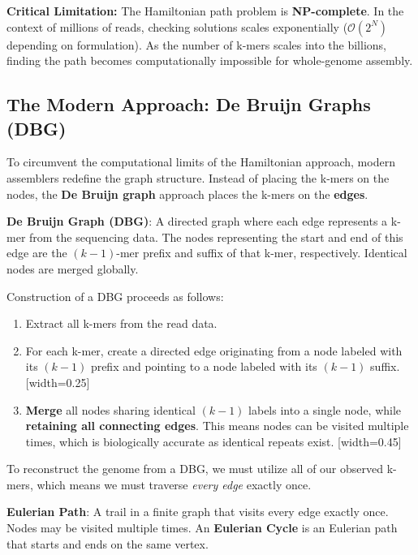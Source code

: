 
\sta \textbf{Critical Limitation:} The Hamiltonian path problem is \textbf{NP-complete}. In the context of millions of reads, checking solutions scales exponentially ($\mathcal{O}(2^N)$ depending on formulation). As the number of k-mers scales into the billions, finding the path becomes computationally impossible for whole-genome assembly.

\subsection{The Modern Approach: De Bruijn Graphs (DBG)}
To circumvent the computational limits of the Hamiltonian approach, modern assemblers redefine the graph structure. Instead of placing the k-mers on the nodes, the \textbf{De Bruijn graph} approach places the k-mers on the \textbf{edges}.

\begin{important}
    \textbf{De Bruijn Graph (DBG)}: A directed graph where each edge represents a k-mer from the sequencing data. The nodes representing the start and end of this edge are the $(k-1)$-mer prefix and suffix of that k-mer, respectively. Identical nodes are merged globally.
\end{important}

Construction of a DBG proceeds as follows:
\begin{enumerate}
    \item Extract all k-mers from the read data.
    \item For each k-mer, create a directed edge originating from a node labeled with its $(k-1)$ prefix and pointing to a node labeled with its $(k-1)$ suffix.
[width=0.25\textwidth]
    \item \textbf{Merge} all nodes sharing identical $(k-1)$ labels into a single node, while \textbf{retaining all connecting edges}. This means nodes can be visited multiple times, which is biologically accurate as identical repeats exist.
[width=0.45\textwidth]
\end{enumerate}

To reconstruct the genome from a DBG, we must utilize all of our observed k-mers, which means we must traverse \textit{every edge} exactly once.

\begin{important}
    \textbf{Eulerian Path}: A trail in a finite graph that visits every edge exactly once. Nodes may be visited multiple times. An \textbf{Eulerian Cycle} is an Eulerian path that starts and ends on the same vertex.
\end{important}

